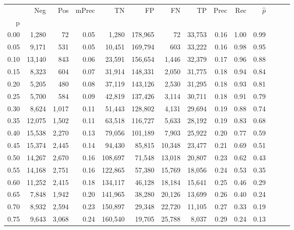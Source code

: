 \begin{tabular}{rrrrrrrrrrrrrr}
\toprule
{} &     Neg &    Pos & mPrec &       TN &       FP &      FN &      TP &  Prec &   Rec & $\hat{p}$ \\
p    &         &        &       &          &          &         &         &       &       &           \\
\midrule
0.00 &   1,280 &     72 &  0.05 &    1,280 &  178,965 &      72 &  33,753 &  0.16 &  1.00 &      0.99 \\
0.05 &   9,171 &    531 &  0.05 &   10,451 &  169,794 &     603 &  33,222 &  0.16 &  0.98 &      0.95 \\
0.10 &  13,140 &    843 &  0.06 &   23,591 &  156,654 &   1,446 &  32,379 &  0.17 &  0.96 &      0.88 \\
0.15 &   8,323 &    604 &  0.07 &   31,914 &  148,331 &   2,050 &  31,775 &  0.18 &  0.94 &      0.84 \\
0.20 &   5,205 &    480 &  0.08 &   37,119 &  143,126 &   2,530 &  31,295 &  0.18 &  0.93 &      0.81 \\
0.25 &   5,700 &    584 &  0.09 &   42,819 &  137,426 &   3,114 &  30,711 &  0.18 &  0.91 &      0.79 \\
0.30 &   8,624 &  1,017 &  0.11 &   51,443 &  128,802 &   4,131 &  29,694 &  0.19 &  0.88 &      0.74 \\
0.35 &  12,075 &  1,502 &  0.11 &   63,518 &  116,727 &   5,633 &  28,192 &  0.19 &  0.83 &      0.68 \\
0.40 &  15,538 &  2,270 &  0.13 &   79,056 &  101,189 &   7,903 &  25,922 &  0.20 &  0.77 &      0.59 \\
0.45 &  15,374 &  2,445 &  0.14 &   94,430 &   85,815 &  10,348 &  23,477 &  0.21 &  0.69 &      0.51 \\
0.50 &  14,267 &  2,670 &  0.16 &  108,697 &   71,548 &  13,018 &  20,807 &  0.23 &  0.62 &      0.43 \\
0.55 &  14,168 &  2,751 &  0.16 &  122,865 &   57,380 &  15,769 &  18,056 &  0.24 &  0.53 &      0.35 \\
0.60 &  11,252 &  2,415 &  0.18 &  134,117 &   46,128 &  18,184 &  15,641 &  0.25 &  0.46 &      0.29 \\
0.65 &   7,848 &  1,942 &  0.20 &  141,965 &   38,280 &  20,126 &  13,699 &  0.26 &  0.40 &      0.24 \\
0.70 &   8,932 &  2,594 &  0.23 &  150,897 &   29,348 &  22,720 &  11,105 &  0.27 &  0.33 &      0.19 \\
0.75 &   9,643 &  3,068 &  0.24 &  160,540 &   19,705 &  25,788 &   8,037 &  0.29 &  0.24 &      0.13 \\

\end{tabular}
